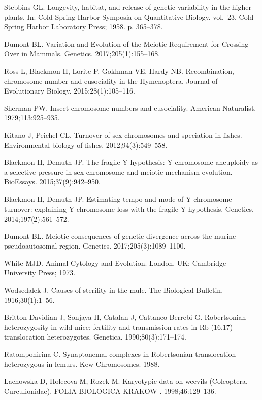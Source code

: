 \documentclass[]{rsos}%
\begin{document}
\begin{thebibliography}{9}
Stebbins GL.
 Longevity, habitat, and release of genetic variability in the higher
  plants.
 In: Cold Spring Harbor Symposia on Quantitative Biology. vol.~23.
  Cold Spring Harbor Laboratory Press; 1958. p. 365--378.

Dumont BL.
 Variation and Evolution of the Meiotic Requirement for Crossing Over
  in Mammals.
 Genetics. 2017;205(1):155--168.

Ross L, Blackmon H, Lorite P, Gokhman VE, Hardy NB.
 Recombination, chromosome number and eusociality in the
  {H}ymenoptera.
 Journal of Evolutionary Biology. 2015;28(1):105--116.

Sherman PW.
 Insect chromosome numbers and eusociality.
 American Naturalist. 1979;113:925--935.

Kitano J, Peichel CL.
 Turnover of sex chromosomes and speciation in fishes.
 Environmental biology of fishes. 2012;94(3):549--558.

Blackmon H, Demuth JP.
 The fragile Y hypothesis: Y chromosome aneuploidy as a selective
  pressure in sex chromosome and meiotic mechanism evolution.
 BioEssays. 2015;37(9):942--950.

Blackmon H, Demuth JP.
 Estimating tempo and mode of Y chromosome turnover: explaining Y
  chromosome loss with the fragile Y hypothesis.
 Genetics. 2014;197(2):561--572.

Dumont BL.
 Meiotic consequences of genetic divergence across the murine
  pseudoautosomal region.
 Genetics. 2017;205(3):1089--1100.

White MJD.
 Animal Cytology and Evolution.
 London, UK: Cambridge University Press; 1973.

Wodsedalek J.
 Causes of sterility in the mule.
 The Biological Bulletin. 1916;30(1):1--56.

Britton-Davidian J, Sonjaya H, Catalan J, Cattaneo-Berrebi G.
 Robertsonian heterozygosity in wild mice: fertility and transmission
  rates in Rb (16.17) translocation heterozygotes.
 Genetica. 1990;80(3):171--174.

Ratomponirina C.
 Synaptonemal complexes in Robertsonian translocation heterozygous in
  lemurs.
 Kew Chromosomes. 1988.

Lachowska D, Holecova M, Rozek M.
 Karyotypic data on weevils (Coleoptera, Curculionidae).
 FOLIA BIOLOGICA-KRAKOW-. 1998;46:129--136.


\end{thebibliography}
\end{document}
